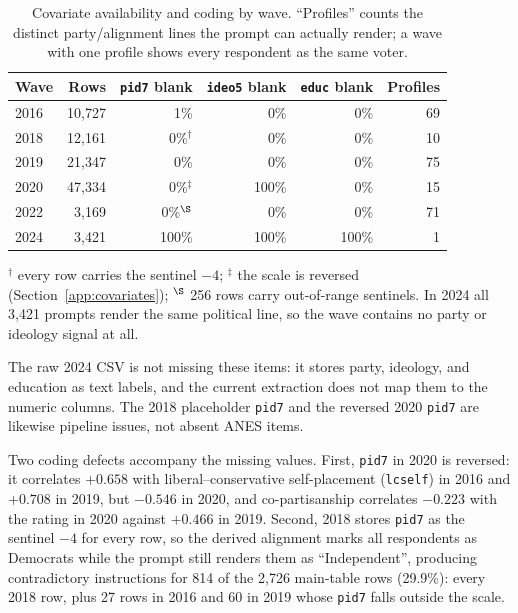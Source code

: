 \begin{table}[h]
\centering
\small
\caption{Covariate availability and coding by wave. ``Profiles'' counts the
distinct party/alignment lines the prompt can actually render; a wave with one
profile shows every respondent as the same voter.}
\label{tab:covariates}
\begin{tabular}{lrrrrr}
\toprule
Wave & Rows & \texttt{pid7} blank & \texttt{ideo5} blank & \texttt{educ} blank & Profiles \\
\midrule
2016 & 10,727 & 1\% & 0\% & 0\% & 69 \\
2018 & 12,161 & 0\%$^{\dagger}$ & 0\% & 0\% & 10 \\
2019 & 21,347 & 0\% & 0\% & 0\% & 75 \\
2020 & 47,334 & 0\%$^{\ddagger}$ & 100\% & 0\% & 15 \\
2022 & 3,169 & 0\%$^{\S}$ & 0\% & 0\% & 71 \\
2024 & 3,421 & 100\% & 100\% & 100\% & 1 \\
\bottomrule
\end{tabular}
\par\smallskip\footnotesize
$^{\dagger}$ every row carries the sentinel $-4$; $^{\ddagger}$ the scale is
reversed (Section~\ref{app:covariates}); $^{\S}$ 256 rows carry out-of-range
sentinels. In 2024 all 3,421 prompts render the same political line, so the wave
contains no party or ideology signal at all.
\end{table}

The raw 2024 CSV is not missing these items: it stores party, ideology, and
education as text labels, and the current extraction does not map them to the
numeric columns. The 2018 placeholder \texttt{pid7} and the reversed 2020
\texttt{pid7} are likewise pipeline issues, not absent ANES items.

Two coding defects accompany the missing values. First, \texttt{pid7} in 2020 is
reversed: it correlates $+0.658$ with liberal--conservative self-placement
(\texttt{lcself}) in 2016 and $+0.708$ in 2019, but $-0.546$ in 2020, and
co-partisanship correlates $-0.223$ with the rating in 2020 against $+0.466$ in
2019. Second, 2018 stores \texttt{pid7} as the sentinel $-4$ for every row, so the
derived alignment marks all respondents as Democrats while the prompt still
renders them as ``Independent'', producing contradictory instructions for 814 of
the 2,726 main-table rows (29.9\%): every 2018 row, plus 27 rows in 2016 and 60
in 2019 whose \texttt{pid7} falls outside the scale.

